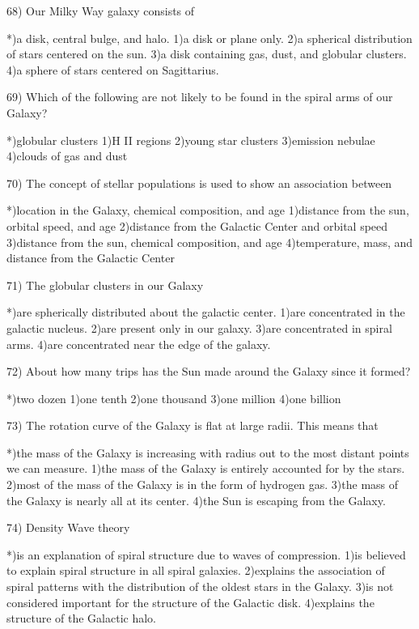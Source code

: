 68) Our Milky Way galaxy consists of
 
 *)a disk, central bulge, and halo.
 1)a disk or plane only.
 2)a spherical distribution of stars centered on the sun.
 3)a disk containing gas, dust, and globular clusters.
 4)a sphere of stars centered on Sagittarius.
 
69) Which of the following are not likely to be found in the spiral arms
    of our Galaxy?
 
 *)globular clusters
 1)H II regions
 2)young star clusters
 3)emission nebulae
 4)clouds of gas and dust
 
70) The concept of stellar populations is used to show an association
    between
 
 *)location in the Galaxy, chemical composition, and age
 1)distance from the sun, orbital speed, and age
 2)distance from the Galactic Center and orbital speed
 3)distance from the sun, chemical composition, and age
 4)temperature, mass, and distance from the Galactic Center
 
71) The globular clusters in our Galaxy
 
 *)are spherically distributed about the galactic center.
 1)are concentrated in the galactic nucleus.
 2)are present only in our galaxy.
 3)are concentrated in spiral arms.
 4)are concentrated near the edge of the galaxy.
 
72) About how many trips has the Sun made around the Galaxy since it
    formed?
 
 *)two dozen
 1)one tenth
 2)one thousand
 3)one million
 4)one billion
 
73) The rotation curve of the Galaxy is flat at large radii.  This
    means that
 
 *)the mass of the Galaxy is increasing with radius out to the most
   distant points we can measure.
 1)the mass of the Galaxy is entirely accounted for by the stars.
 2)most of the mass of the Galaxy is in the form of hydrogen gas.
 3)the mass of the Galaxy is nearly all at its center.
 4)the Sun is escaping from the Galaxy.
 
74) Density Wave theory 
 
 *)is an explanation of spiral structure due to waves of compression.
 1)is believed to explain spiral structure in all spiral galaxies.
 2)explains the association of spiral patterns with the distribution
   of the oldest stars in the Galaxy.
 3)is not considered important for the structure of the Galactic disk.
 4)explains the structure of the Galactic halo.
 
